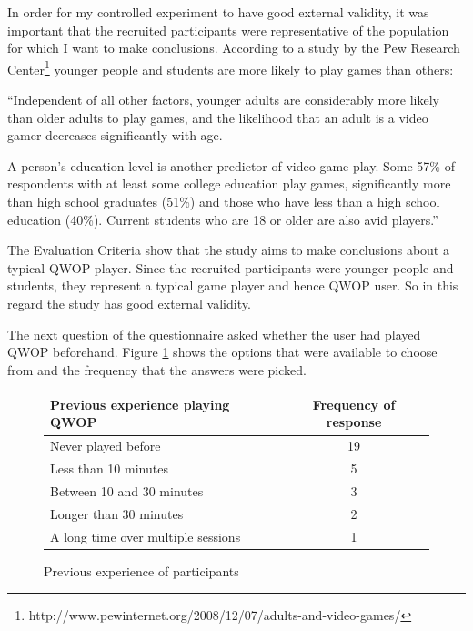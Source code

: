 \documentclass[12pt,a4paper,twoside,openright]{report}
\begin{document}
In order for my controlled experiment to have good external validity, it was important that the recruited participants were representative of the population for which I want to make conclusions.
According to a study by the Pew Research Center\footnote{http://www.pewinternet.org/2008/12/07/adults-and-video-games/} younger people and students are more likely to play games than others:

\begin{displayquote}
``Independent of all other factors, younger adults are considerably more likely than older adults to play games, and the likelihood that an adult is a video gamer decreases significantly with age.

A person's education level is another predictor of video game play. Some 57\% of respondents with at least some college education play games, significantly more than high school graduates (51\%) and those who have less than a high school education (40\%). Current students who are 18 or older are also avid players.''
\end{displayquote}

The Evaluation Criteria show that the study aims to make conclusions about a typical QWOP player.
Since the recruited participants were younger people and students, they represent a typical game player and hence QWOP user. So in this regard the study has good external validity.



The next question of the questionnaire asked whether the user had played QWOP beforehand. Figure \ref{previousExperienceTable} shows the options that were available to choose from and the frequency that the answers were picked.

\begin{figure}[tbh]
\begin{center}
\begin{tabular}{ |l|c| }
  \hline
  Previous experience playing QWOP   & Frequency of response \\ \hline \hline  Never played before                & 19 \\ \hline
  Less than 10 minutes               & 5  \\ \hline
  Between 10 and 30 minutes          & 3  \\ \hline
  Longer than 30 minutes             & 2  \\ \hline
  A long time over multiple sessions & 1  \\ \hline
\end{tabular}
\end{center}
\caption{Previous experience of participants}
\label{previousExperienceTable}
\end{figure}
\end{document}
